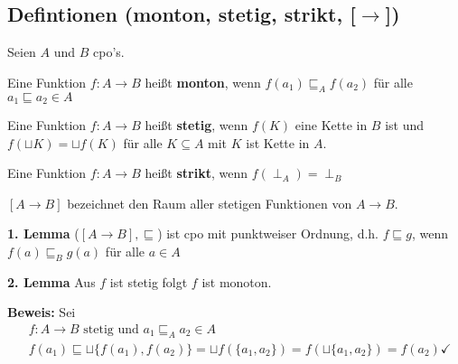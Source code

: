 \begin{compactitem}
\subsection{Defintionen (monton, stetig, strikt, [$\rightarrow$])}
Seien $A$ und $B$ cpo's. 
\begin{compactitem}
	\item Eine Funktion $f: A \rightarrow B$ heißt \textbf{monton}, wenn $f(a_1) \sqsubseteq_A f(a_2)$ für alle $a_1 \sqsubseteq a_2 \in A$
	\item Eine Funktion $f: A \rightarrow B$ heißt \textbf{stetig}, wenn $f(K)$ eine Kette in $B$ ist und $f(\sqcup K) = \sqcup f(K)$ für alle $K \subseteq A$ mit $K$ ist Kette in $A$.
	\item Eine Funktion $f: A \rightarrow B$ heißt \textbf{strikt}, wenn $f(\perp_A) = \perp_B$
	\item $[A\rightarrow B]$ bezeichnet den Raum aller stetigen Funktionen von $A \rightarrow B$.
	\item[\textbf{1. Lemma}] ($[A\rightarrow B], \sqsubseteq$) ist cpo mit punktweiser Ordnung, d.h. $f \sqsubseteq g$, wenn $f (a) \sqsubseteq_B g(a)$ für alle $a \in A$
	\item[\textbf{2. Lemma}] Aus $f$ ist stetig folgt $f$ ist monoton.
	\item[\textbf{Beweis:}] Sei
	\begin{align*}
	&f: A \rightarrow B \text{ stetig und } a_1 \sqsubseteq_A a_2 \in A\\
	&f(a_1) \sqsubseteq \sqcup\{f(a_1), f(a_2) \} = \sqcup f(\{a_1, a_2\}) = f (\sqcup\{a_1, a_2\}) = f(a_2) \checkmark\\
	\end{align*}
\end{compactitem}

\end{compactitem}

